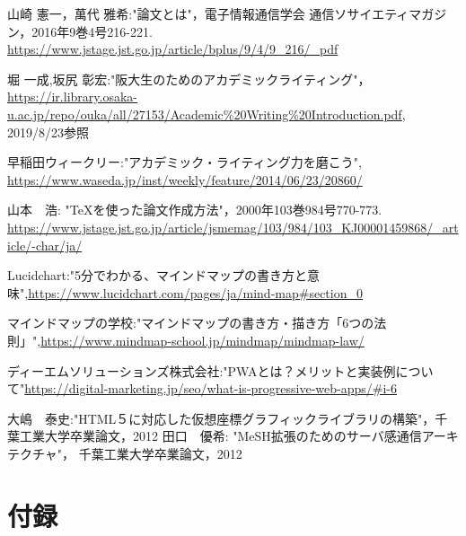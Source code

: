 \documentclass[a4j,12pt]{jarticle}
\begin{document}
 \begin{thebibliography}{99}
山崎 憲一，萬代 雅希:"論文とは"，電子情報通信学会 通信ソサイエティマガジン，2016年9巻4号216-221.
\url{https://www.jstage.jst.go.jp/article/bplus/9/4/9_216/_pdf}

 堀 一成,坂尻 彰宏:"阪大生のためのアカデミックライティング"，
\url{https://ir.library.osaka-u.ac.jp/repo/ouka/all/27153/Academic%20Writing%20Introduction.pdf}, 2019/8/23参照

早稲田ウィークリー:"アカデミック・ライティング力を磨こう",
\url{https://www.waseda.jp/inst/weekly/feature/2014/06/23/20860/}

 山本　浩: "TeXを使った論文作成方法"，2000年103巻984号770-773.
\url{https://www.jstage.jst.go.jp/article/jsmemag/103/984/103_KJ00001459868/_article/-char/ja/}

 Lucidchart:"5分でわかる、マインドマップの書き方と意味",\url{https://www.lucidchart.com/pages/ja/mind-map#section_0}

 マインドマップの学校:"マインドマップの書き方・描き方「6つの法則」",\url{https://www.mindmap-school.jp/mindmap/mindmap-law/}

 ディーエムソリューションズ株式会社:"PWAとは？メリットと実装例について"\url{https://digital-marketing.jp/seo/what-is-progressive-web-apps/#i-6}

大嶋　泰史:"HTML５に対応した仮想座標グラフィックライブラリの構築"，千葉工業大学卒業論文，2012
田口　優希: "MeSH拡張のためのサーバ感通信アーキテクチャ"， 千葉工業大学卒業論文，2012

\end{thebibliography}
\newpage
\section*{付録}

\end{document}
